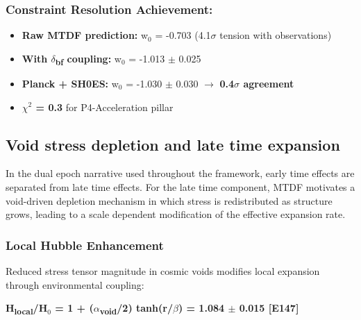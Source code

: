 \documentclass[11pt,a4paper]{article}
\begin{document}
\begin{mdframed}[linecolor=accent,linewidth=0.5pt,backgroundcolor=callout-bg,leftline=true,rightline=true,topline=true,bottomline=true,innerleftmargin=8pt,innerrightmargin=8pt,innertopmargin=6pt,innerbottommargin=6pt]
\subsubsection{Constraint Resolution Achievement:}
\begin{itemize}
  \item \textbf{Raw MTDF prediction:} w$_{0}$ = -0.703 (4.1$\sigma$ tension with observations)
  \item \textbf{With $\delta$\textsubscript{bf} coupling:} w$_{0}$ = -1.013 $\pm$ 0.025
  \item \textbf{Planck + SH0ES:} w$_{0}$ = -1.030 $\pm$ 0.030 $\rightarrow$ \textbf{0.4$\sigma$ agreement}
  \item \textbf{$\chi$$^{2}$ = 0.3} for P4-Acceleration pillar
\end{itemize}
\end{mdframed}

\subsection{Void stress depletion and late time expansion}
In the dual epoch narrative used throughout the framework, early time effects are separated from late time effects. For the late time component, MTDF motivates a void-driven depletion mechanism in which stress is redistributed as structure grows, leading to a scale dependent modification of the effective expansion rate.

\subsubsection{Local Hubble Enhancement}
Reduced stress tensor magnitude in cosmic voids modifies local expansion through environmental coupling:

\textbf{H\textsubscript{local}/H$_{0}$ = 1 + ($\alpha$\textsubscript{void}/2) tanh(r/\allowbreak{}$\beta$) = 1.084 $\pm$ 0.015 [E147]}
\end{document}
